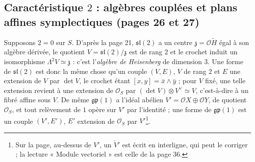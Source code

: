 \documentclass[11pt,a4paper]{article}
\begin{document}
\subsection*{Caractéristique $2$ : algèbres couplées et plans affines symplectiques (pages 26 et 27)}

Supposons $2 = 0$ sur $S$. D'après la page 21, $\mathfrak{sl}(2)$ a un centre
$\mathfrak{z} = \mathcal{O}\widetilde{H}$ égal à son algèbre dérivée, le quotient
$V = \mathfrak{sl}(2)/\mathfrak{z}$ est de rang $2$ et le crochet induit un isomorphisme
$\Lambda^2 V \simeq \mathfrak{z}$ : c'est l'\emph{algèbre de Heisenberg} de dimension
$3$. Une forme de $\mathfrak{sl}(2)$ est donc la même chose qu'un couple $(V, E)$,
$V$ de rang $2$ et $E$ une extension de $V$ par $\det V$, le crochet étant
$[x, y] = \bar{x} \wedge \bar{y}$ ; pour $V$ fixé, une telle extension revient à une
extension de $\mathcal{O}_S$ par $(\det V) \otimes V^{\vee} \simeq V$, c'est-à-dire à un
fibré affine sous $V$. De même $\mathfrak{gp}(1)$ a l'idéal abélien
$V' = \mathcal{O}X \oplus \mathcal{O}Y$, de quotient $\mathcal{O}_S$, et tout relèvement de $1$
opère sur $V'$ par l'identité ; une forme de $\mathfrak{gp}(1)$ est un couple
$(V', E')$, $E'$ extension de $\mathcal{O}_S$ par $V'$\footnote{Sur la page, au-dessus
de $V'$, un $\check{V}'$ est écrit en interligne, qui peut le corriger ; la
lecture « Module vectoriel » est celle de la page 36.}.
\end{document}
